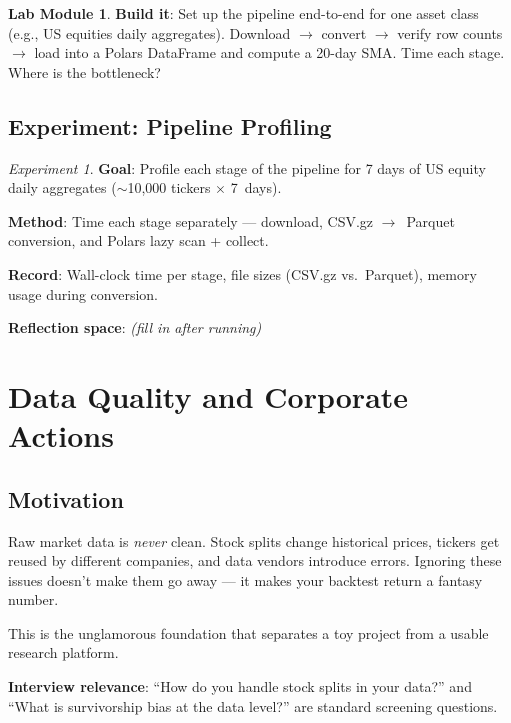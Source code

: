 \documentclass[a4paper, 11pt]{report}
\theoremstyle{definition}
\newtheorem{labmod}{Lab Module}[chapter]
\theoremstyle{remark}
\newtheorem{experiment}{Experiment}[chapter]
\begin{document}
\begin{labmod}
    \textbf{Build it}: Set up the pipeline end-to-end for one asset class
    (e.g., US equities daily aggregates).  Download $\to$ convert $\to$ verify
    row counts $\to$ load into a Polars DataFrame and compute a 20-day SMA\@.
    Time each stage.  Where is the bottleneck?
\end{labmod}

\section{Experiment: Pipeline Profiling}

\begin{experiment}
    \textbf{Goal}: Profile each stage of the pipeline for 7 days of US equity
    daily aggregates ($\sim$10{,}000 tickers $\times$
    7~days).

    \textbf{Method}: Time each stage separately --- download, CSV.gz
    $\to$~Parquet conversion, and Polars lazy scan + collect.

    \textbf{Record}: Wall-clock time per stage, file sizes (CSV.gz vs.\ Parquet),
    memory usage during conversion.

    \textbf{Reflection space}: \emph{(fill in after running)}
\end{experiment}


\chapter{Data Quality and Corporate Actions}
\label{ch:data-quality}

\section{Motivation}

Raw market data is \emph{never} clean.  Stock splits change historical prices,
tickers get reused by different companies, and data vendors introduce errors.
Ignoring these issues doesn't make them go away --- it makes your backtest return
a fantasy number.

This is the unglamorous foundation that separates a toy project from a usable
research platform.

\textbf{Interview relevance}: ``How do you handle stock splits in your data?''
and ``What is survivorship bias at the data level?'' are standard screening
questions.
\end{document}

